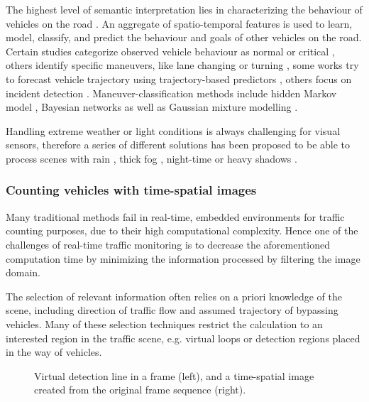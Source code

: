 The highest level of semantic interpretation lies in characterizing the behaviour of vehicles on the road \cite{Sivaraman2013}.
An aggregate of spatio-temporal features is used to learn, model, classify, and predict the behaviour and goals of other vehicles on the road.
Certain studies categorize observed vehicle behaviour as normal or critical \cite{Cherng2009}, others identify specific maneuvers, like lane changing or turning \cite{Garcia2012}, some works try to forecast vehicle trajectory using trajectory-based predictors \cite{Hermes2009}, others focus on incident detection \cite{Kamijo2004}.
Maneuver-classification methods include hidden Markov model \cite{Sivaraman2011}, Bayesian networks \cite{Kasper2012} as well as Gaussian mixture modelling \cite{Wiest2012}.

Handling extreme weather or light conditions is always challenging for visual sensors, therefore a series of different solutions has been proposed to be able to process scenes with rain \cite{Yu2015,Barnum2010}, thick fog \cite{Zhou2014a,Tarel2009}, night-time \cite{Bi2009, Robert2009} or heavy shadows \cite{Kamkar2016, Miller2015}.

\subsubsection{Counting vehicles with time-spatial images}
Many traditional methods fail in real-time, embedded environments for traffic counting purposes, due to their high computational complexity.
Hence one of the challenges of real-time traffic monitoring is to decrease the aforementioned computation time by minimizing the information processed by filtering the image domain.

The selection of relevant information often relies on a priori knowledge of the scene, including direction of traffic flow and assumed trajectory of bypassing vehicles.
Many of these selection techniques restrict the calculation to an interested region in the traffic scene, e.g. virtual loops \cite{Tursun2013a, He2008} or detection regions \cite{Miller2015, Engel2016} placed in the way of vehicles.

\begin{figure}[!h]
	\centering
	
	\caption{Virtual detection line in a frame (left), and a time-spatial image created from the original frame sequence (right).\label{fig:TSI}}
\end{figure}

